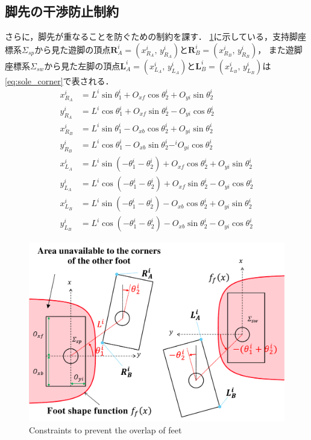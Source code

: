 \documentclass[autodetect-engine,dvipdfmx-if-dvi,ja=standard,a4j,jbase=11pt,magstyle=nomag*]{bxjsreport}
\begin{document}
\subsection{脚先の干渉防止制約}
さらに，脚先が重なることを防ぐための制約を課す．
\cref{fig:const_overlap}に示している，支持脚座標系$\Sigma_{sp}$から見た遊脚の頂点$\bm{R}_A^i = (x_{R_A}^i ,\, y_{R_A}^i)$と$\bm{R}_B^i = (x_{R_B}^i ,\, y_{R_B}^i)$，
また遊脚座標系$\Sigma_{sw}$から見た左脚の頂点$\bm{L}_A^i = (x_{L_A}^i ,\, y_{L_A}^i)$と$\bm{L}_B^i = (x_{L_B}^i ,\, y_{L_B}^i)$は\cref{eq:sole_corner}で表される．
\begin{equation}
\label{eq:sole_corner}
    \begin{aligned}
        x_{R_A}^i & = L^i \sin \theta_1^i + O_{xf} \cos \theta_2^i + O_{yi} \sin \theta_2^i \\
        y_{R_A}^i & = L^i \cos \theta_1^i + O_{xf} \sin \theta_2^i - O_{yi} \cos \theta_2^i \\
        x_{R_B}^i & = L^i \sin \theta_1^i - O_{xb} \cos \theta_2^i + O_{yi} \sin \theta_2^i \\
        y_{R_B}^i & = L^i \cos \theta_1^i - O_{xb} \sin \theta_2^i - ^iO_{yi} \cos \theta_2^i \\
        x_{L_A}^i & = L^i \sin \left( - \theta_1^i - \theta_2^i \right) + O_{xf} \cos \theta_2^i + O_{yi} \sin \theta_2^i \\
        y_{L_A}^i & = L^i \cos \left( - \theta_1^i - \theta_2^i \right) + O_{xf} \sin \theta_2^i - O_{yi} \cos \theta_2^i \\
        x_{L_B}^i & = L^i \sin \left( - \theta_1^i - \theta_2^i \right) - O_{xb} \cos \theta_2^i + O_{yi} \sin \theta_2^i \\
        y_{L_B}^i & = L^i \cos \left( - \theta_1^i - \theta_2^i \right) - O_{xb} \sin \theta_2^i - O_{yi} \cos \theta_2^i 
    \end{aligned}
\end{equation}
%
\begin{figure}[t]
    \centering
    \includegraphics[width=\linewidth, clip]{./figure/const_overlap.pdf}
    \caption{Constraints to prevent the overlap of feet}
    \label{fig:const_overlap}
\end{figure}
\end{document}
